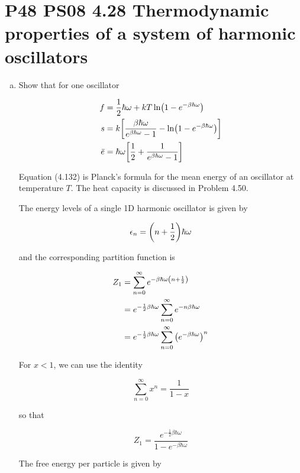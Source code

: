 \documentclass[9pt,a4paper,twocolumn]{article}
\begin{document}
\section{P48 PS08 4.28 Thermodynamic properties of a system of harmonic oscillators}
\begin{enumerate}[(a)]

\item Show that for one oscillator

\begin{align}
	f &= \frac{1}{2}\hbar\omega + kT\ln(1 - e^{-\beta\hbar\omega}) \\
	s &= k\qty[\frac{\beta\hbar\omega}{e^{\beta\hbar\omega} - 1} - \ln(1 - e^{-\beta\hbar\omega})] \\
	\bar{e} &= \hbar\omega\qty[\frac{1}{2} + \frac{1}{e^{\beta\hbar\omega} - 1}]
\end{align}

Equation (4.132) is Planck’s formula for the mean energy of an oscillator at temperature $T$. The heat capacity is discussed in Problem 4.50.

The energy levels of a single 1D harmonic oscillator is given by

\begin{equation}
	\epsilon_n = \qty(n + \frac{1}{2})\hbar\omega \label{eq:energy-levels}
\end{equation}

and the corresponding partition function is

\begin{align*}
	Z_1 &= \sum_{n=0}^\infty e^{-\beta\hbar\omega\qty(n+\frac{1}{2})} \\
	&= e^{-\frac{1}{2}\beta\hbar\omega} \sum_{n=0}^\infty e^{-n\beta\hbar\omega} \\
	&= e^{-\frac{1}{2}\beta\hbar\omega} \sum_{n=0}^\infty \qty(e^{-\beta\hbar\omega})^n
\end{align*}

For $x < 1$, we can use the identity

\begin{equation} \label{eq:geometric-identity}
	\sum_{n=0}^\infty x^n = \frac{1}{1-x}
\end{equation}

so that

\begin{equation}
	Z_1 = \frac{e^{-\frac{1}{2}\beta\hbar\omega}}{1 - e^{-\beta\hbar\omega}} \label{eq:partition}
\end{equation}

The free energy per particle is given by


\end{enumerate}
\end{document}
